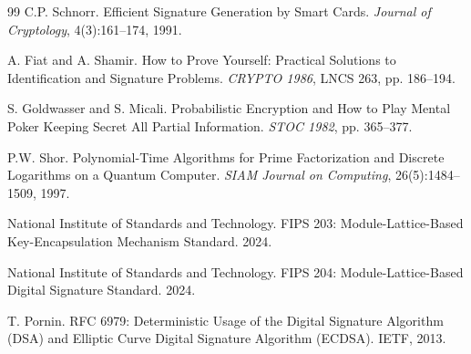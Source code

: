 \documentclass[11pt,a4paper]{article}
\begin{document}
\begin{thebibliography}{99}
 C.P. Schnorr. Efficient Signature Generation by Smart Cards. \textit{Journal of Cryptology}, 4(3):161--174, 1991.

 A. Fiat and A. Shamir. How to Prove Yourself: Practical Solutions to Identification and Signature Problems. \textit{CRYPTO 1986}, LNCS 263, pp. 186--194.

 S. Goldwasser and S. Micali. Probabilistic Encryption and How to Play Mental Poker Keeping Secret All Partial Information. \textit{STOC 1982}, pp. 365--377.

 P.W. Shor. Polynomial-Time Algorithms for Prime Factorization and Discrete Logarithms on a Quantum Computer. \textit{SIAM Journal on Computing}, 26(5):1484--1509, 1997.

 National Institute of Standards and Technology. FIPS 203: Module-Lattice-Based Key-Encapsulation Mechanism Standard. 2024.

 National Institute of Standards and Technology. FIPS 204: Module-Lattice-Based Digital Signature Standard. 2024.

 T. Pornin. RFC 6979: Deterministic Usage of the Digital Signature Algorithm (DSA) and Elliptic Curve Digital Signature Algorithm (ECDSA). IETF, 2013.
\end{thebibliography}
\end{document}
